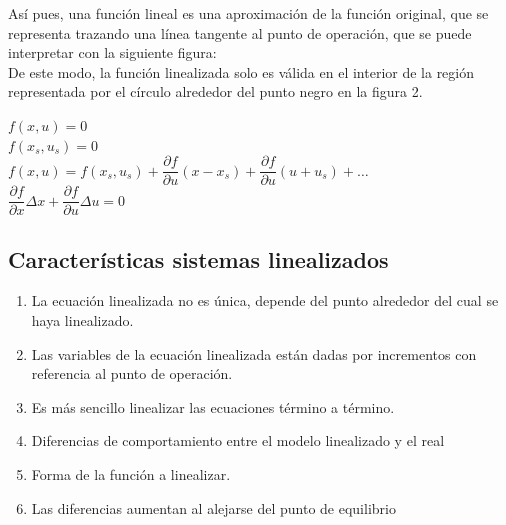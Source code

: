 \documentclass[a4paper,12pt,twoside]{proyectotanquesecci}
\begin{document}
Así pues, una función lineal es una aproximación de la función original, que se representa trazando una línea tangente al punto de operación, que se puede interpretar con la siguiente figura:\\


De este modo, la función linealizada solo es válida en el interior de la región representada por el círculo alrededor del punto negro en la figura 2.\\

\begin{center}
	$f\left( x,u\right)=0$\\
	$f\left( x_{s},u_{s}\right) =0$\\
	$f\left( x,u\right) = f\left( x_{s},u_{s}\right) +\dfrac {\partial f}{\partial u}\left( x-x_{s}\right) +\dfrac {\partial f}{\partial u}\left( u+u_{s}\right) +\ldots$\\
	$\dfrac {\partial f}{\partial x}\Delta x+\dfrac {\partial f}{\partial u}\Delta u=0$
\end{center}

\subsection{Características sistemas linealizados}

\begin{enumerate}
\item La ecuación linealizada no es única, depende del punto alrededor del cual se haya linealizado.
\item Las variables de la ecuación linealizada están dadas por incrementos con referencia al punto de operación.
\item Es más sencillo linealizar las ecuaciones término a término.
\item Diferencias de comportamiento entre el modelo linealizado y el real
\item Forma de la función a linealizar.
\item Las diferencias aumentan al alejarse del punto de equilibrio 
\end{enumerate}
\end{document}
